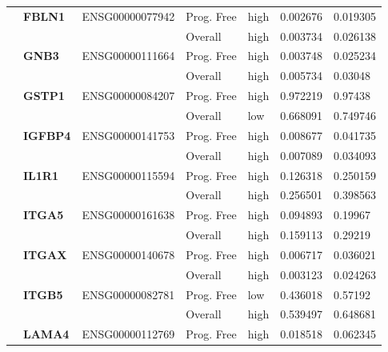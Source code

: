 \begin{spacing}{1}
{\begin{longtable}{%
            |>{\bfseries}p{2cm}|
            >{\bfseries}p{1.9cm}|
            >{\tiny}p{1.9cm}|
            p{2cm}|
            p{2cm}|
            p{1.5cm}|
            p{1.5cm}|
            }
             & FBLN1    & ENSG00000077942 & Prog. Free & high & 0.002676 & 0.019305 \\
            \hhline{~~~----}
             &          &                 & Overall    & high & 0.003734 & 0.026138 \\
            \hhline{~======}
             & GNB3     & ENSG00000111664 & Prog. Free & high & 0.003748 & 0.025234 \\
            \hhline{~~~----}
             &          &                 & Overall    & high & 0.005734 & 0.03048  \\
            \hhline{~======}
             & GSTP1    & ENSG00000084207 & Prog. Free & high & 0.972219 & 0.97438  \\
            \hhline{~~~----}
             &          &                 & Overall    & low  & 0.668091 & 0.749746 \\
            \hhline{~======}
             & IGFBP4   & ENSG00000141753 & Prog. Free & high & 0.008677 & 0.041735 \\
            \hhline{~~~----}
             &          &                 & Overall    & high & 0.007089 & 0.034093 \\
            \hhline{~======}
             & IL1R1    & ENSG00000115594 & Prog. Free & high & 0.126318 & 0.250159 \\
            \hhline{~~~----}
             &          &                 & Overall    & high & 0.256501 & 0.398563 \\
            \hhline{~======}
             & ITGA5    & ENSG00000161638 & Prog. Free & high & 0.094893 & 0.19967  \\
            \hhline{~~~----}
             &          &                 & Overall    & high & 0.159113 & 0.29219  \\
            \hhline{~======}
             & ITGAX    & ENSG00000140678 & Prog. Free & high & 0.006717 & 0.036021 \\
            \hhline{~~~----}
             &          &                 & Overall    & high & 0.003123 & 0.024263 \\
            \hhline{~======}
             & ITGB5    & ENSG00000082781 & Prog. Free & low  & 0.436018 & 0.57192  \\
            \hhline{~~~----}
             &          &                 & Overall    & high & 0.539497 & 0.648681 \\
            \hhline{~======}
             & LAMA4    & ENSG00000112769 & Prog. Free & high & 0.018518 & 0.062345 \\

\end{longtable}}
\end{spacing}
